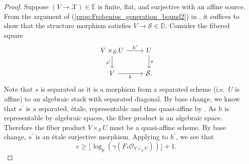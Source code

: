 \documentclass[11pt]{amsart}
\def\eqref#1{\textcolor{darkblue}{(\ref{#1})}}
\theoremstyle{plain}
\theoremstyle{definition}
\numberwithin{equation}{section}
\numberwithin{theorem}{section}
\begin{document}
\begin{proof}
    Suppose $(V \to \mathcal{X})\in \mathbb{E}$ is finite, flat, and surjective with an affine source. 
    From the argument of \eqref{prop:Frobenius_generation_bound2} in , it suffices to show that the structure morphism satisfies $V\to \mathcal{S}\in \mathbb{D}$. 
    Consider the fibered square
    \begin{displaymath}
        \begin{tikzcd}
            {V\times_\mathcal{S} U} & U \\
            V & {\mathcal{S}.}
            \arrow["{h^\prime}", from=1-1, to=1-2]
            \arrow["{s^\prime}"', from=1-1, to=2-1]
            \arrow["s", from=1-2, to=2-2]
            \arrow["h"', from=2-1, to=2-2]
        \end{tikzcd}
    \end{displaymath}
    Note that $s$ is separated as it is a morphism from a separated scheme (i.e.\ $U$ is affine) to an algebraic stack with separated diagonal. 
    By base change, we know that $s^\prime$ is a separated, \'{e}tale, representable and thus quasi-affine by \cite[Proposition 3.1]{Rydh:2015}. 
    As $h$ is representable by algebraic spaces, the fiber product is an algebraic space. 
    Therefore the fiber product $V\times_\mathcal{S} U$ must be a quasi-affine scheme. 
    By base change, $s^\prime$ is an \'{e}tale surjective morphism. 
    Applying  to $h^\prime$, we see that
    \begin{displaymath}
        c \geq \lfloor \log_p ( \gamma (F_\ast \mathcal{O}_{V\times_\mathcal{S} U}) ) \rfloor +1.
    \end{displaymath}


\end{proof}
\end{document}
